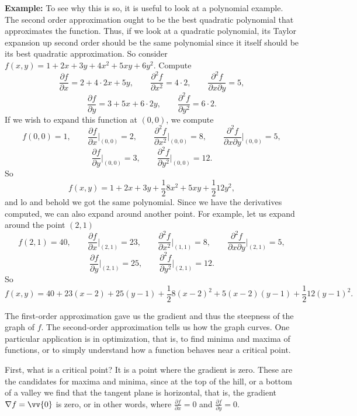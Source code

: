 \documentclass[12pt]{article}
\begin{document}
\medskip

\textbf{Example:}
To see why this is so, it is useful to look at a polynomial example.  The
second order approximation ought to be the best quadratic polynomial that
approximates the function.
Thus, if we look at a quadratic polynomial,
its Taylor expansion up second order should be the
same polynomial
since it itself should be its best
quadratic approximation.
So consider $f(x,y) = 1 + 2x + 3y + 4x^2+ 5xy + 6y^2$.  Compute
\[
\frac{\partial f}{\partial x} = 2 + 4 \cdot 2x + 5y, \qquad
\frac{\partial^2 f}{\partial x^2} = 4 \cdot 2, \qquad
\frac{\partial^2 f}{\partial x \partial y} = 5 ,
\]
\[
\frac{\partial f}{\partial y} = 3 + 5x + 6 \cdot 2y, \qquad
\frac{\partial^2 f}{\partial y^2} = 6 \cdot 2 .
\]
If we wish to expand this function at $(0,0)$, we compute
\[
f(0,0) = 1, \qquad
\frac{\partial f}{\partial x}\Big|_{(0,0)} = 2, \qquad
\frac{\partial^2 f}{\partial x^2}\Big|_{(0,0)} = 8, \qquad
\frac{\partial^2 f}{\partial x \partial y}\Big|_{(0,0)} = 5 ,
\]
\[
\frac{\partial f}{\partial y}\Big|_{(0,0)} = 3, \qquad
\frac{\partial^2 f}{\partial y^2}\Big|_{(0,0)} = 12 .
\]
So
\[
f(x,y) = 1 + 2 x + 3 y + \frac{1}{2} 8 x^2 + 5 xy + \frac{1}{2} 12 y^2 ,
\]
and lo and behold we got the same polynomial.
Since we have the derivatives computed, we can also expand around another
point.  For example, let us expand around the point $(2,1)$
\[
f(2,1) = 40, \qquad
\frac{\partial f}{\partial x}\Big|_{(2,1)} = 23, \qquad
\frac{\partial^2 f}{\partial x^2}\Big|_{(1,1)} = 8, \qquad
\frac{\partial^2 f}{\partial x \partial y}\Big|_{(2,1)} = 5 ,
\]
\[
\frac{\partial f}{\partial y}\Big|_{(2,1)} = 25, \qquad
\frac{\partial^2 f}{\partial y^2}\Big|_{(2,1)} = 12 .
\]
So
\[
f(x,y) = 40 + 23(x-2) + 25 (y-1) + \frac{1}{2} 8 (x-2)^2 + 5 (x-2)(y-1) +
\frac{1}{2} 12 (y-1)^2 .
\]

\medskip

The first-order approximation gave us the gradient and thus the
steepness of the graph of $f$.  The second-order approximation tells us how
the graph curves.  One particular application is in optimization, that is,
to find minima and maxima of functions, or to simply understand how a
function behaves near a critical point.

First, what is a critical point?  It is a point where the gradient is zero.
These are the candidates for maxima and minima, since at the top of the
hill, or a bottom of a valley we find that the tangent plane is horizontal,
that is, the gradient $\nabla f = \vv{0}$ is zero,
or in other words, where
$\frac{\partial f}{\partial x} = 0$ and
$\frac{\partial f}{\partial y} = 0$.
\end{document}
